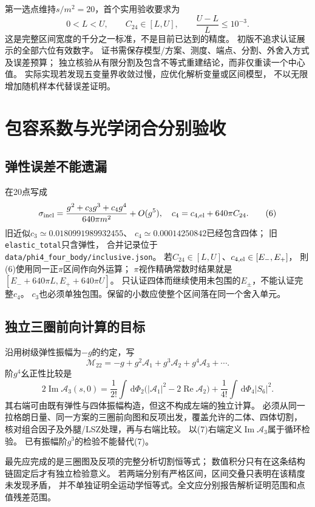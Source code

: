 \documentclass[11pt,a4paper]{ctexart}
\theoremstyle{cnplain}\newtheorem{proposition}{命题}[section]
\newcommand{\dd}{\,\mathrm d}
\begin{document}
第一选点维持$s/m^2=20$，首个实用验收要求为
\[
 0<L<U,\qquad C_{24}\in[L,U],\qquad \frac{U-L}{L}\le10^{-3}. \tag{5}
\]
这是完整区间宽度的千分之一标准，不是目前已达到的精度。
初版不追求认证展示的全部六位有效数字。
证书需保存模型/方案、测度、端点、分割、外舍入方式及误差预算；
独立核验从有限分割及包含不等式重建结论，而非仅重读一个中心值。
实际实现若发现五变量界收敛过慢，应优化解析变量或区间模型，
不以无限增加随机样本代替误差证明。

\section{包容系数与光学闭合分别验收}
\subsection{弹性误差不能遗漏}
在20点写成
\[
 \sigma_{\rm incl}
 =\frac{g^2+c_3g^3+c_4g^4}{640\pi m^2}+O(g^5),\quad
 c_4=c_{4,\rm el}+640\pi C_{24}.                         \tag{6}
\]
旧近似$c_3\simeq0.0180991989932455$、
$c_4\simeq0.00014250842$已经包含四体；
旧\texttt{elastic\_total}只含弹性，
合并记录位于\texttt{data/phi4\_four\_body/inclusive.json}。
若$C_{24}\in[L,U]$、$c_{4,\rm el}\in[E_-,E_+]$，
則(6)使用同一正$\pi$区间作向外运算；
$\pi$视作精确常数时结果就是
$[E_-+640\pi L,E_++640\pi U]$。
只认证四体而继续使用未包围的$E_\pm$，不能认证完整$c_4$。
$c_3$也必须单独包围。保留的小数应使整个区间落在同一个舍入单元。

\subsection{独立三圈前向计算的目标}
沿用树级弹性振幅为$-g$的约定，写
\[
 \mathcal M_{22}=-g+g^2\mathcal A_1+g^3\mathcal A_2
                      +g^4\mathcal A_3+\cdots.
\]
阶$g^4$幺正性比较是
\[
 2\operatorname{Im}\mathcal A_3(s,0)
 =\frac1{2!}\int\dd\Phi_2
       \bigl(|\mathcal A_1|^2-2\operatorname{Re}\mathcal A_2\bigr)
  +\frac1{4!}\int\dd\Phi_4|S_6|^2.                       \tag{7}
\]
其右端可由既有弹性与四体振幅构造，但这不构成左端的独立计算。
必须从同一拉格朗日量、同一方案的三圈前向图和反项出发，覆盖允许的二体、四体切割，
核对组合因子及外腿/LSZ处理，再与右端比较。
以(7)右端定义$\operatorname{Im}\mathcal A_3$属于循环检验。
已有振幅阶$g^3$的检验不能替代(7)。

最先应完成的是三圈图及反项的完整分析切割恒等式；
数值积分只有在这条结构链固定后才有独立检验意义。
若两端分别有严格区间，区间交叠只表明在该精度未发现矛盾，
并不单独证明全运动学恒等式。全文应分别报告解析证明范围和点值残差范围。
\end{document}
